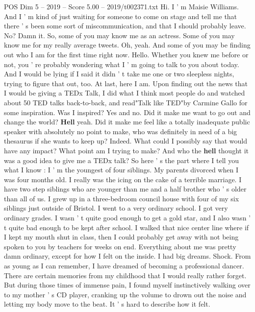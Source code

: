 \begin{textsample}{POS Dim 5 – 2019 – Score 5.00 – 2019/t002371.txt}  \label{ex:f5_pos_078}
Hi.
I ' m Maisie Williams.
And I ' m kind of just waiting for someone to come on stage and tell me that there ' s been some sort of miscommunication, and that I should probably leave.
No?
Damn it.
So, some of you may know me as an actress.
Some of you may know me for my really average tweets.
Oh, yeah.
And some of you may be finding out who I am for the first time right now.
Hello.
Whether you knew me before or not, you ' re probably wondering what I ' m going to talk to you about today.
And I would be lying if I said it didn ' t take me one or two sleepless nights, trying to figure that out, too.
At last, here I am.
Upon finding out the news that I would be giving a TEDx Talk, I did what I think most people do and watched about 50 TED talks back-to-back, and read"Talk like TED"by Carmine Gallo for some inspiration.
Was I inspired?
Yes and no.
Did it make me want to go out and change the world? \textbf{Hell} yeah.
Did it make me feel like a totally inadequate public speaker with absolutely no point to make, who was definitely in need of a big thesaurus if she wants to keep up?
Indeed.
What could I possibly say that would have any impact?
What point am I trying to make?
And who the \textbf{hell} thought it was a good idea to give me a TEDx talk?
So here ' s the part where I tell you what I know : I ' m the youngest of four siblings.
My parents divorced when I was four months old.
I really was the icing on the cake of a terrible marriage.
I have two step siblings who are younger than me and a half brother who ' s older than all of us.
I grew up in a three-bedroom council house with four of my six siblings just outside of Bristol.
I went to a very ordinary school.
I got very ordinary grades.
I wasn ' t quite good enough to get a gold star, and I also wasn ' t quite bad enough to be kept after school.
I walked that nice center line where if I kept my mouth shut in class, then I could probably get away with not being spoken to you by teachers for weeks on end.
Everything about me was pretty damn ordinary, except for how I felt on the inside.
I had big dreams.
Shock.
From as young as I can remember, I have dreamed of becoming a professional dancer.
There are certain memories from my childhood that I would really rather forget.
But during those times of immense pain, I found myself instinctively walking over to my mother ' s CD player, cranking up the volume to drown out the noise and letting my body move to the beat.
It ' s hard to describe how it felt.

\end{textsample}
